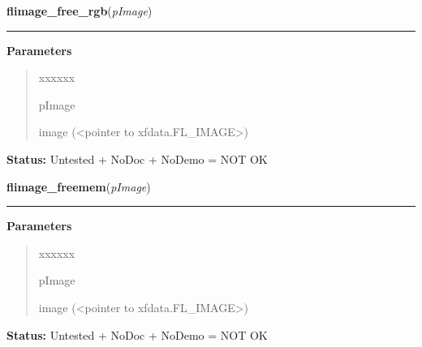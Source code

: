 \hspace{.8\funcindent}\begin{boxedminipage}{\funcwidth}

    \raggedright \textbf{flimage\_free\_rgb}(\textit{pImage})

    \vspace{-1.5ex}

    \rule{\textwidth}{0.5\fboxrule}
\setlength{\parskip}{2ex}
\setlength{\parskip}{1ex}
      \textbf{Parameters}
      \vspace{-1ex}

      \begin{quote}
        \begin{Ventry}{xxxxxx}

          \item[pImage]

          image ({\textless}pointer to xfdata.FL\_IMAGE{\textgreater})

        \end{Ventry}

      \end{quote}

\textbf{Status:} Untested + NoDoc + NoDemo = NOT OK



    \end{boxedminipage}

    \label{xformslib:flflimage:flimage_freemem}

    \vspace{0.5ex}

\hspace{.8\funcindent}\begin{boxedminipage}{\funcwidth}

    \raggedright \textbf{flimage\_freemem}(\textit{pImage})

    \vspace{-1.5ex}

    \rule{\textwidth}{0.5\fboxrule}
\setlength{\parskip}{2ex}
\setlength{\parskip}{1ex}
      \textbf{Parameters}
      \vspace{-1ex}

      \begin{quote}
        \begin{Ventry}{xxxxxx}

          \item[pImage]

          image ({\textless}pointer to xfdata.FL\_IMAGE{\textgreater})

        \end{Ventry}

      \end{quote}

\textbf{Status:} Untested + NoDoc + NoDemo = NOT OK



    \end{boxedminipage}

